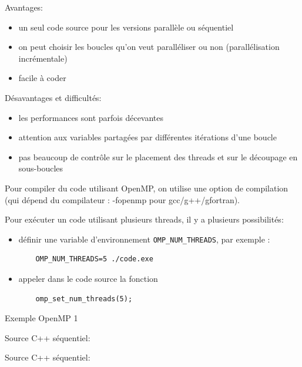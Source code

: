 \documentclass{beamer}
\begin{document}
\begin{frame}

Avantages:
\begin{itemize}
	\item un seul code source pour les versions parallèle ou séquentiel
	\item on peut choisir les boucles qu'on veut paralléliser ou non (parallélisation incrémentale)
	\item facile à coder
\end{itemize}
\vfill

Désavantages et difficultés:
\begin{itemize}
	\item les performances sont parfois décevantes
	\item attention aux variables partagées par différentes itérations d'une boucle
	\item pas beaucoup de contrôle sur le placement des threads et sur le découpage en sous-boucles
\end{itemize}

\end{frame}

\begin{frame}[fragile]

Pour compiler du code utilisant OpenMP, on utilise une option de compilation (qui dépend du compilateur : -fopenmp pour gcc/g++/gfortran).

\vfill
Pour exécuter un code utilisant plusieurs threads, il y a plusieurs possibilités:
\begin{itemize}
	\item définir une variable d'environnement \verb|OMP_NUM_THREADS|, par exemple :
	\begin{lstlisting}
	OMP_NUM_THREADS=5 ./code.exe
	\end{lstlisting}
	\item appeler dans le code source la fonction
	\begin{lstlisting}
	omp_set_num_threads(5);
	\end{lstlisting}
\end{itemize}
\vfill
\end{frame}

\begin{frame}
	Exemple OpenMP 1
\end{frame}


\begin{frame}[fragile]
	Source C++ séquentiel:
	\vfill
{
	\normalsize
		
}
\end{frame}

\begin{frame}[fragile]
	Source C++ séquentiel:
	\vfill
	{
		\normalsize
			
	}
\end{frame}
\end{document}

